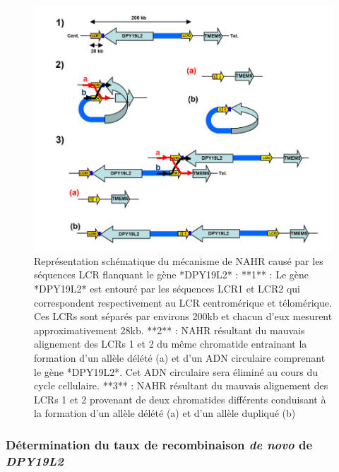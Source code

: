 \documentclass[12pt,twoside]{reedthesis}
\theoremstyle{definition}
\theoremstyle{definition}
\theoremstyle{remark}
\begin{document}
  \begin{figure}
  
  {\centering \includegraphics[scale=0.5]{figure/dpy_nahr} 
  
  }
  
  \caption[Représentation schématique du mécanisme de NAHR causé par les séquences LCR flanquant le gène *DPY19L2*]{Représentation schématique du mécanisme de NAHR causé par les séquences LCR flanquant le gène *DPY19L2* : **1** : Le gène *DPY19L2* est entouré par les séquences LCR1 et LCR2 qui correspondent respectivement au LCR centromérique et télomérique. Ces LCRs sont séparés par environs 200kb et chacun d'eux mesurent approximativement 28kb. **2** : NAHR résultant du mauvais alignement des LCRs 1 et 2 du même chromatide entrainant la formation d'un allèle délété (a) et d'un ADN circulaire comprenant le gène *DPY19L2*. Cet ADN circulaire sera éliminé au cours du cycle cellulaire. **3** : NAHR résultant du mauvais alignement des LCRs 1 et 2 provenant de deux chromatides différents conduisant à la formation d'un allèle délété (a) et d'un allèle dupliqué (b)}\label{fig:nahr}
  \end{figure}
  
  \subsubsection{\texorpdfstring{Détermination du taux de recombinaison
  \emph{de novo} de
  \emph{DPY19L2}}{Détermination du taux de recombinaison de novo de DPY19L2}}\label{determination-du-taux-de-recombinaison-de-novo-de-dpy19l2}
  
\end{document}
